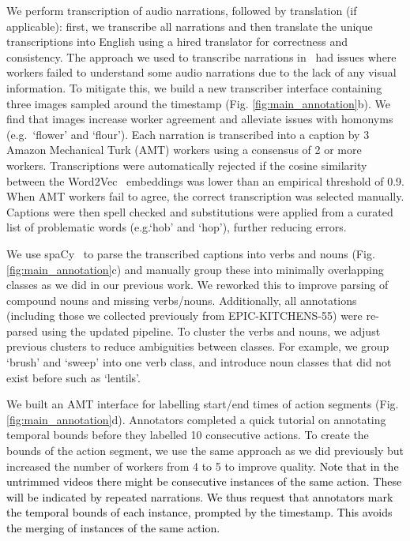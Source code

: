 \documentclass[twocolumn]{svjour3}          \smartqed
\makeatletter
\newcommand{\chParagraph}[1]{\noindent {\textbf{#1.}} \hspace{6pt}}
\newcommand{\edits}[1]{\textcolor{black}{#1}}
\newcommand {\oldDataset} {EPIC-KITCHENS-55{}}
\newcommand*{\eg}{e.g.\@\xspace}
\makeatother
\begin{document}
\chParagraph{(b) Transcriber}
We perform transcription of audio narrations, followed by translation (if applicable): first, we transcribe all narrations and then translate the unique transcriptions into English using a hired translator for correctness and consistency.
The approach we used to transcribe narrations in~\cite{Damen2018EPICKITCHENS} had issues where workers failed to understand some audio narrations due to the lack of any visual information.
To mitigate this, we build a new transcriber interface containing three images sampled around the timestamp (Fig. \ref{fig:main_annotation}b).
We find that images increase worker agreement and alleviate issues with homonyms (\eg~`flower' and `flour').
Each narration is transcribed into a caption by 3 Amazon Mechanical Turk (AMT) workers using a consensus of 2 or more workers.
Transcriptions were automatically rejected if the cosine similarity between the Word2Vec~\cite{mikolov2013efficient} embeddings was lower than an empirical threshold of 0.9.
When AMT workers fail to agree, the correct transcription was selected manually.
Captions were then spell checked and substitutions were applied from a curated list of problematic words (\eg `hob' and `hop'), further reducing errors.

\chParagraph{(c) Parser}
We use spaCy~\cite{spacy2} to parse the transcribed captions into verbs and nouns (Fig. \ref{fig:main_annotation}c) and manually group these into minimally overlapping classes as we did in our previous work.
We reworked this to improve parsing of compound nouns and missing verbs/nouns. Additionally, all annotations (including those we collected previously from \oldDataset) were re-parsed using the updated pipeline.
To cluster the verbs and nouns, we adjust previous clusters to reduce ambiguities between classes. For example, we group `brush' and `sweep' into one verb class, and introduce noun classes that did not exist before such as `lentils'.


\chParagraph{(d) Temporal Annotator}
We built an AMT interface for labelling start/end times of action segments (Fig. \ref{fig:main_annotation}d).
Annotators completed a quick tutorial on annotating temporal bounds before they labelled 10 consecutive actions.
To create the bounds of the action segment, we use the same approach as we did previously but increased the number of workers from 4 to 5 to improve quality.
\edits{Note that in the untrimmed videos there might be consecutive instances of the same action. These will be indicated by repeated narrations. We thus request that annotators mark the temporal bounds of each instance, prompted by the timestamp. This avoids the merging of instances of the same action.}
\end{document}
